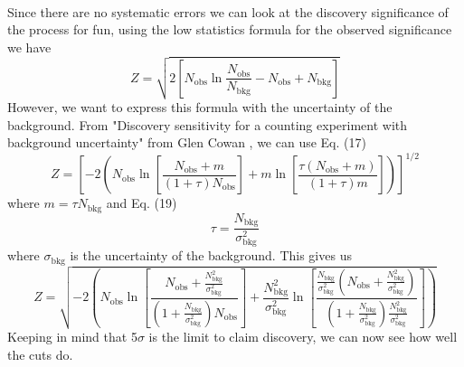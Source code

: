 \documentclass[14pt, a4paper]{book}
\begin{document}
\\Since there are no systematic errors we can look at the discovery significance of the process for fun, using the low statistics formula for the observed significance we have
\begin{equation}
    Z = \sqrt{2\left[N_{\text{obs}}\ln\frac{N_{\text{obs}}}{N_{\text{bkg}}}-N_{\text{obs}}+N_{\text{bkg}}\right]}
\end{equation}
However, we want to express this formula with the uncertainty of the background. From "Discovery sensitivity for a counting experiment with background uncertainty" from Glen Cowan 
\cite{Cowan_Uncertainty_in_sig}, we can use Eq. (17) 
$$
Z = \left[-2\left(N_{\text{obs}}\ln\left[\frac{N_{\text{obs}}+m}{(1+\tau)N_{\text{obs}}}\right] + m\ln\left[\frac{\tau(N_{\text{obs}}+m)}{(1+\tau)m}\right]\right)\right]^{1/2}
$$
where $m=\tau N_{\text{bkg}}$ and Eq. (19)
$$
\tau=\frac{N_{\text{bkg}}}{\sigma_{\text{bkg}}^2}
$$
where $\sigma_{\text{bkg}}$ is the uncertainty of the background. This gives us
\begin{equation}
    Z = \sqrt{-2\left(N_{\text{obs}}\ln\left[\frac{N_{\text{obs}}+\frac{N_{\text{bkg}}^2}{\sigma_{\text{bkg}}^2} }{(1+\frac{N_{\text{bkg}}}{\sigma_{\text{bkg}}^2})N_{\text{obs}}}\right] + \frac{N_{\text{bkg}}^2}{\sigma_{\text{bkg}}^2} \ln\left[\frac{\frac{N_{\text{bkg}}}{\sigma_{\text{bkg}}^2}(N_{\text{obs}}+\frac{N_{\text{bkg}}^2}{\sigma_{\text{bkg}}^2} )}{(1+\frac{N_{\text{bkg}}}{\sigma_{\text{bkg}}^2})\frac{N_{\text{bkg}}^2}{\sigma_{\text{bkg}}^2}}\right]\right)}
\end{equation}
Keeping in mind that 5$\sigma$ is the limit to claim discovery, we can now see how well the cuts do.



\clearpage
\end{document}
